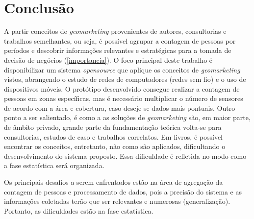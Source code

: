 \chapter{Conclusão}
\label{conclusao}

A partir conceitos de \emph{geomarketing} provenientes
de autores, consultorias e trabalhos semelhantes, ou seja, é
possível agrupar a contagem de pessoas por períodos e descobrir informações relevantes e estratégicas
para a tomada de decisão de negócios (\autoref{importancia}). O foco principal deste trabalho
é disponibilizar um sistema
\emph{opensource} que aplique os conceitos de \emph{geomarketing} vistos, abrangendo o
estudo de redes de computadores (redes sem fio) e o uso de dispositivos móveis. O protótipo desenvolvido
consegue realizar a contagem de pessoas em zonas específicas,
mas é necessário multiplicar o número de sensores de acordo
com a área e cobertura, caso deseje-se dados mais pontuais. Outro ponto a ser salientado, é como a
as soluções de \emph{geomarketing} são, em maior parte, de âmbito privado, grande parte
da fundamentação teórica volta-se para consultorias, estudos de caso e trabalhos correlatos. Em livros, é
possível encontrar os conceitos, entretanto, não como são aplicados, dificultando o
desenvolvimento do sistema proposto. Essa dificuldade é refletida no modo como a fase
estatística será organizada.

Os principais desafios a serem enfrentados estão na área de agregação da
contagem de pessoas e processamento de dados, pois a precisão do sistema e as
informações coletadas terão que ser relevantes e numerosas (generalização).
Portanto, as dificuldades estão na fase estatística.
